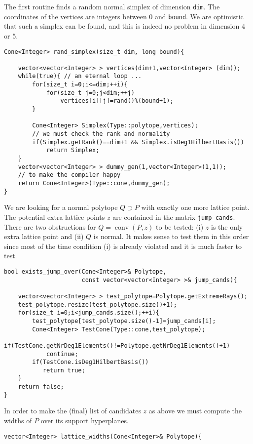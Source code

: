 \documentclass[12pt,a4paper]{scrartcl}
\theoremstyle{definition}
\begin{document}
\begin{small}
The first routine finds a random normal simplex of dimension \verb|dim|. The coordinates of the vertices are integers between $0$ and \verb|bound|. We are optimistic that such a simplex can be found, and this is indeed no problem in dimension $4$ or $5$.

\begin{Verbatim}
Cone<Integer> rand_simplex(size_t dim, long bound){

    vector<vector<Integer> > vertices(dim+1,vector<Integer> (dim));    
    while(true){ // an eternal loop ...
        for(size_t i=0;i<=dim;++i){
            for(size_t j=0;j<dim;++j)
                vertices[i][j]=rand()%(bound+1);            
        }

        Cone<Integer> Simplex(Type::polytope,vertices);
        // we must check the rank and normality
        if(Simplex.getRank()==dim+1 && Simplex.isDeg1HilbertBasis())
            return Simplex;        
    }
    vector<vector<Integer> > dummy_gen(1,vector<Integer>(1,1)); 
    // to make the compiler happy
    return Cone<Integer>(Type::cone,dummy_gen); 
}
\end{Verbatim}

We are looking for a normal polytope $Q\supset P$ with exactly one more lattice point. The potential extra lattice points $z$ are contained in the matrix \verb|jump_cands|. There are two obstructions for $Q=\operatorname{conv}(P,z)$ to be tested: (i) $z$ is the only extra lattice point and (ii) $Q$ is normal. It makes sense to test them in this order since most of the time condition (i) is already violated and it is much faster to test.
\begin{Verbatim}
bool exists_jump_over(Cone<Integer>& Polytope, 
                      const vector<vector<Integer> >& jump_cands){

    vector<vector<Integer> > test_polytope=Polytope.getExtremeRays();
    test_polytope.resize(test_polytope.size()+1); 
    for(size_t i=0;i<jump_cands.size();++i){
        test_polytope[test_polytope.size()-1]=jump_cands[i];
        Cone<Integer> TestCone(Type::cone,test_polytope);
        if(TestCone.getNrDeg1Elements()!=Polytope.getNrDeg1Elements()+1)
            continue;
        if(TestCone.isDeg1HilbertBasis())
           return true;        
    }    
    return false;    
}
\end{Verbatim}

In order to make the (final) list of candidates $z$ as above we must compute the widths of $P$ over its support hyperplanes.
\begin{Verbatim}
vector<Integer> lattice_widths(Cone<Integer>& Polytope){


\end{Verbatim}
\end{small}
\end{document}
